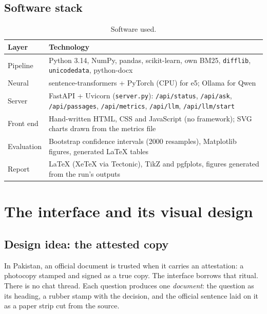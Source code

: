 \documentclass[11pt,a4paper]{article}
\begin{document}
\subsection{Software stack}
\begin{table}[H]
\centering\small
\begin{tabularx}{\textwidth}{@{}l X@{}}
\toprule
Layer & Technology\\
\midrule
Pipeline & Python 3.14, NumPy, pandas, scikit-learn, own BM25, \texttt{difflib}, \texttt{unicodedata}, python-docx\\
Neural & sentence-transformers + PyTorch (CPU) for e5; Ollama for Qwen\\
Server & FastAPI + Uvicorn (\texttt{server.py}): \texttt{/api/status}, \texttt{/api/ask}, \texttt{/api/passages}, \texttt{/api/metrics}, \texttt{/api/llm}, \texttt{/api/llm/start}\\
Front end & Hand-written HTML, CSS and JavaScript (no framework); SVG charts drawn from the metrics file\\
Evaluation & Bootstrap confidence intervals (2000 resamples), Matplotlib figures, generated \LaTeX{} tables\\
Report & \LaTeX{} (XeTeX via Tectonic), TikZ and pgfplots, figures generated from the run's outputs\\
\bottomrule
\end{tabularx}
\caption{Software used.}
\end{table}

\section{The interface and its visual design}
\label{sec:gui}

\subsection{Design idea: the attested copy}
In Pakistan, an official document is trusted when it carries an attestation: a photocopy stamped and signed as a true copy.
The interface borrows that ritual. There is no chat thread. Each question produces one \emph{document}: the question as its
heading, a rubber stamp with the decision, and the official sentence laid on it as a paper strip cut from the source.
\end{document}

